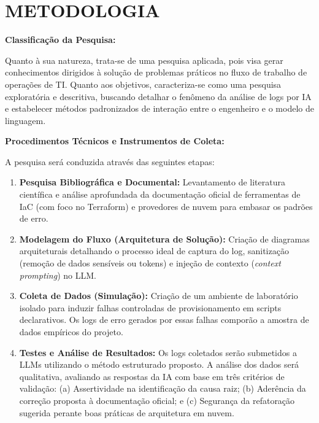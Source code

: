 \section{METODOLOGIA}

\textbf{Classificação da Pesquisa:}

Quanto à sua natureza, trata-se de uma pesquisa aplicada, pois visa gerar conhecimentos dirigidos à solução de problemas práticos no fluxo de trabalho de operações de TI. Quanto aos objetivos, caracteriza-se como uma pesquisa exploratória e descritiva, buscando detalhar o fenômeno da análise de logs por IA e estabelecer métodos padronizados de interação entre o engenheiro e o modelo de linguagem.

\textbf{Procedimentos Técnicos e Instrumentos de Coleta:}

A pesquisa será conduzida através das seguintes etapas:

\begin{enumerate}
    \item[a.] \textbf{Pesquisa Bibliográfica e Documental:} Levantamento de literatura científica e análise aprofundada da documentação oficial de ferramentas de IaC (com foco no Terraform) e provedores de nuvem para embasar os padrões de erro.
    \item[b.] \textbf{Modelagem do Fluxo (Arquitetura de Solução):} Criação de diagramas arquiteturais detalhando o processo ideal de captura do log, sanitização (remoção de dados sensíveis ou tokens) e injeção de contexto (\textit{context prompting}) no LLM.
    \item[c.] \textbf{Coleta de Dados (Simulação):} Criação de um ambiente de laboratório isolado para induzir falhas controladas de provisionamento em scripts declarativos. Os logs de erro gerados por essas falhas comporão a amostra de dados empíricos do projeto.
    \item[d.] \textbf{Testes e Análise de Resultados:} Os logs coletados serão submetidos a LLMs utilizando o método estruturado proposto. A análise dos dados será qualitativa, avaliando as respostas da IA com base em três critérios de validação: (a) Assertividade na identificação da causa raiz; (b) Aderência da correção proposta à documentação oficial; e (c) Segurança da refatoração sugerida perante boas práticas de arquitetura em nuvem.
\end{enumerate}
